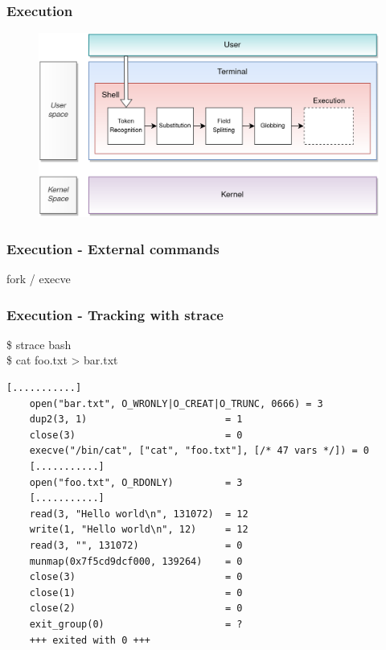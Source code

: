 \documentclass[aspectratio=169,10pt]{beamer}
\begin{document}
\begin{frame}
  \frametitle{Execution}
    \begin{figure}[h]
        \includegraphics[scale=0.8]{./images/ShellStepsBeforeExecution}
    \end{figure}
\end{frame}

\begin{frame}
  \frametitle{Execution - External commands}
    \begin{center}
        {\huge fork / execve}
    \end{center}
\end{frame}

\begin{frame}[fragile]
  \frametitle{Execution - Tracking with strace}
  \$ strace bash\\
  \$ cat foo.txt > bar.txt

  \vspace{\baselineskip}

    \begin{lstlisting}[basicstyle=\scriptsize,]
    [...........]
    open("bar.txt", O_WRONLY|O_CREAT|O_TRUNC, 0666) = 3
    dup2(3, 1)                        = 1
    close(3)                          = 0
    execve("/bin/cat", ["cat", "foo.txt"], [/* 47 vars */]) = 0
    [...........]
    open("foo.txt", O_RDONLY)         = 3
    [...........]
    read(3, "Hello world\n", 131072)  = 12
    write(1, "Hello world\n", 12)     = 12
    read(3, "", 131072)               = 0
    munmap(0x7f5cd9dcf000, 139264)    = 0
    close(3)                          = 0
    close(1)                          = 0
    close(2)                          = 0
    exit_group(0)                     = ?
    +++ exited with 0 +++
    \end{lstlisting}
\end{frame}
\end{document}
